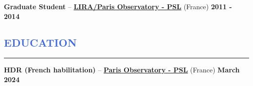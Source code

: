 \documentclass[11pt]{article}
\begin{document}
\vspace{-0.22cm}
\textbf{Graduate Student} --
\href{https://observatoiredeparis.psl.eu/?lang=en}{\textbf{LIRA/Paris Observatory - PSL}} (France)
\hfill        { \bf 2011 - 2014}\\




%


\vspace{-0.45cm}
\textcolor{RoyalBlue}{\section{\large EDUCATION}
\vspace{-0.35cm}\hrule}
\vspace{0.4cm}

\textbf{HDR (French habilitation)} --
\href{https://observatoiredeparis.psl.eu/?lang=en}{\textbf{Paris Observatory - PSL}} (France)
\hfill  { \bf March 2024}\\
\end{document}
